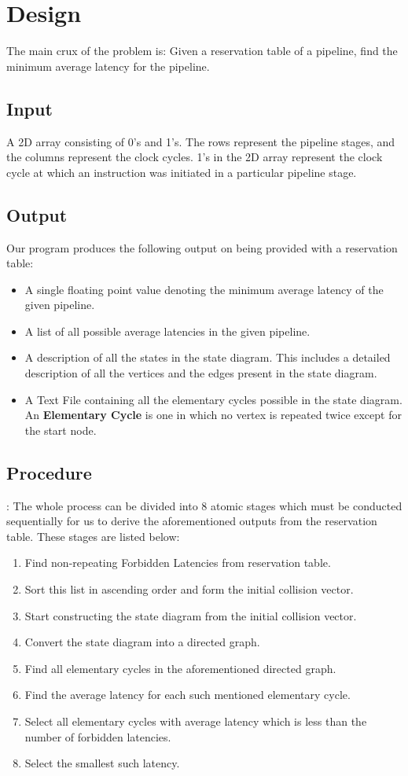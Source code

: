 \documentclass{article}
\begin{document}
\section{Design}

The main crux of the problem is: Given a reservation table of a pipeline, find the minimum average latency for the pipeline.\\
\subsection{Input} 
A 2D array consisting of 0's and 1's. The rows represent the pipeline stages, and the columns represent the clock cycles. 1's in the 2D array represent the clock cycle at which an instruction was initiated in a particular pipeline stage.
\subsection{Output}
Our program produces the following output on being provided with a reservation table:
\begin{itemize}
    \item A single floating point value denoting the minimum average latency of the given pipeline.
    \item A list of all possible average latencies in the given pipeline.
    \item A description of all the states in the state diagram. This includes a detailed description of all the vertices and the edges present in the state diagram.
    \item A Text File containing all the elementary cycles possible in the state diagram. An \textbf{Elementary Cycle} is one in which no vertex is repeated twice except for the start node.
\end{itemize}

\subsection{Procedure}:
The whole process can be divided into 8 atomic stages which must be conducted sequentially for us to derive the aforementioned outputs from the reservation table. These stages are listed below:
\begin{enumerate}
    \item Find non-repeating Forbidden Latencies from reservation table.
    \item Sort this list in ascending order and form the initial collision vector.
    \item Start constructing the state diagram from the initial collision vector.
    \item Convert the state diagram into a directed graph.
    \item Find all elementary cycles in the aforementioned directed graph.
    \item Find the average latency for each such mentioned elementary cycle.
    \item Select all elementary cycles with average latency which is less than the number of forbidden latencies.
    \item Select the smallest such latency.
\end{enumerate}
\end{document}
